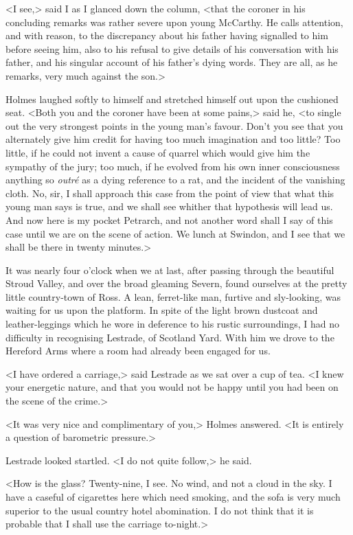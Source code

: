 <I see,> said I as I glanced down the column, <that the coroner in his concluding remarks was rather severe upon young McCarthy. He calls attention, and with reason, to the discrepancy about his father having signalled to him before seeing him, also to his refusal to give details of his conversation with his father, and his singular account of his father's dying words. They are all, as he remarks, very much against the son.>

Holmes laughed softly to himself and stretched himself out upon the cushioned seat. <Both you and the coroner have been at some pains,> said he, <to single out the very strongest points in the young man's favour. Don't you see that you alternately give him credit for having too much imagination and too little? Too little, if he could not invent a cause of quarrel which would give him the sympathy of the jury; too much, if he evolved from his own inner consciousness anything so \textit{outré} as a dying reference to a rat, and the incident of the vanishing cloth. No, sir, I shall approach this case from the point of view that what this young man says is true, and we shall see whither that hypothesis will lead us. And now here is my pocket Petrarch, and not another word shall I say of this case until we are on the scene of action. We lunch at Swindon, and I see that we shall be there in twenty minutes.>

It was nearly four o'clock when we at last, after passing through the beautiful Stroud Valley, and over the broad gleaming Severn, found ourselves at the pretty little country-town of Ross. A lean, ferret-like man, furtive and sly-looking, was waiting for us upon the platform. In spite of the light brown dustcoat and leather-leggings which he wore in deference to his rustic surroundings, I had no difficulty in recognising Lestrade, of Scotland Yard. With him we drove to the Hereford Arms where a room had already been engaged for us.

<I have ordered a carriage,> said Lestrade as we sat over a cup of tea. <I knew your energetic nature, and that you would not be happy until you had been on the scene of the crime.>

<It was very nice and complimentary of you,> Holmes answered. <It is entirely a question of barometric pressure.>

Lestrade looked startled. <I do not quite follow,> he said.

<How is the glass? Twenty-nine, I see. No wind, and not a cloud in the sky. I have a caseful of cigarettes here which need smoking, and the sofa is very much superior to the usual country hotel abomination. I do not think that it is probable that I shall use the carriage to-night.>

